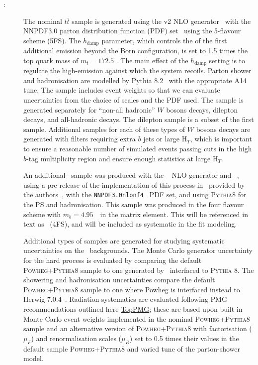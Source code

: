 \begin{description}

\item[\ttbar:] 

The nominal $t\bar{t}$ sample is generated using the {\powheg}
v2 NLO generator~\cite{Nason:2004rx,Frixione:2007vw,Alioli:2010xd} with the
{\textsc NNPDF3.0} parton distribution function (PDF) set~\cite{Ball:2014uwa} using the 5-flavour scheme (5FS). The
$h_{\textrm{damp}}$ parameter, which controls the \pt of the first additional
emission beyond the Born configuration, is set to 1.5 times the top quark mass
of $m_t=172.5$ \gev. The main effect of the $h_{\textrm{damp}}$ setting is to regulate the
high-\pt emission against which the \ttbar system recoils. Parton shower and
hadronisation are modelled by {\textsc Pythia} 8.2~\cite{Sjostrand:2007gs} with
the appropriate A14~\cite{ATLASUETune4} tune. 
The sample includes event
weights so that we can evaluate uncertainties from the choice of scales 
and the PDF used. The sample is
generated separately for ``non-all hadronic'' $W$ bosons decays, dilepton decays,
and all-hadronic decays. The dilepton sample is a subset of the first sample.
Additional samples for each of these types of $W$ bosons decays are generated with
filters requiring extra $b$ jets or large H$_{T}$, which is important to ensure a reasonable
number of simulated events passing cuts in the high $b$-tag multiplicity region and ensure enough statistics at large H$_{T}$.

An additional \ttbin~sample was produced with the \powhegboxRes~\cite{Jezo:2018yaf} NLO
generator and \openloops~\cite{Cascioli:2011va,Denner:2016kdg}, using a pre-release of the implementation of this process in \powhegboxRes\
provided by the authors~\cite{ttbbPowheg}, with the \texttt{NNPDF3.0nlonf4}~\cite{Ball:2014uwa} PDF set, and using \textsc{Pythia8} for the PS and hadronisation. 
This sample was produced in the four flavour scheme with $m_b=4.95$~\GeV~in the matrix element. 
This will be referenced in text as \ttbin~(4FS), and will be included as systematic in the fit modeling. 


Additional types of samples are generated for studying systematic uncertainties
on the \ttbar\ backgrounds. The Monte Carlo generator uncertainty for the hard
process is evaluated by comparing the default \textsc{Powheg+Pythia8} sample to
one generated by \amcatnlo\ interfaced to \textsc{Pythia} 8.
The showering and hadronisation uncertainties compare the default \textsc{Powheg+Pythia8} sample
to one where Powheg is interfaced instead to Herwig 7.0.4~\cite{Bellm:2015jjp,Bahr:2008pv}. Radiation systematics 
are evaluated following PMG recommendations outlined here \href{https://twiki.cern.ch/twiki/bin/view/AtlasProtected/PmgTopProcesses\#Systematic\_uncertainties}{TopPMG};
these are based upon built-in Monte Carlo event weights implemented in the nominal \textsc{Powheg+Pythia8} sample and an alternative version of 
\textsc{Powheg+Pythia8} with factorisation ($\mu_{F}$) and renormalisation scales ($\mu_{R}$) set to 0.5 times their values in the default sample \textsc{Powheg+Pythia8} and varied tune of the parton-shower model.


\end{description}
